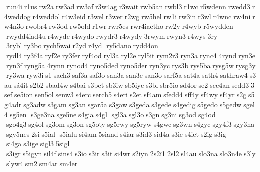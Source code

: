  run4i r1us rw2a rw3ad rw3af r3w4ag r3wait rwb5an rwbl3 r1wc r5wdenn rwedd3 r4weddog r4weddol r4w3eid r3wel r3wer r2wg rw5hel rw1i rw3in r3wl r4wnc rw4ni rw4n3o rwobr4 rw3od rw5old r1wr rwr5es 
rwr4iaetho rw2y r4wyb 	r5wydden  rwydd4iad4u r4wyde r4wydo rwydr3 r4wydy 3rwym rwyn3 r4wys 3ry  3rybl ry3bo rych5wai r2yd r4yd  ry5dano rydd4on  rydl4 ry3f4a ryf2e ry3fer ryf4od ryl3a ryl2e ryl5it rym2r3 ryn3a rync4 4rynd ryn3e ryn3f ryng5a 4rynn rynod4 ryno5ded ryno5der ryn3yc rys3b rys5ba rysg5w rysg3y ry3wa ryw3i s1 sach3 saf3a saf3o san3a san3e san3o sarf5a sat4a sath4 sathraw4 s3au sá4it s2b2 sbad4w s4bai s3bet sb3iw sb5iyc s3bl sbr5io sd4or se2 sec4an sedd3 3sef se5ion sen5ol senw3 s4erc serch5 s4eri s2et sf4am sfedd4 sff4y sf4wy sf4yr s2g s5g4adr sg3adw s3gam sg3an sgar5a s3gaw s3geda s3gede s4gedig s5gedo s5gedw sgel4 sg5en  s3ge3na sge5ne s4gia s4gl  sgl3a sgl3o s3gn sg3ni sg3od sg4od  sgo4g3 sg4ol sg3om sg3on sg5oty sg5rwy sg5ryw s4gwc sg3wn s4gyc sgy4f3 sgy3na sgy5nes 2si s5ial  s5ialu si4am 5siand s4iar s3id3 sid4a s3ie s4iet s2ig s3ig  si4ga s3ige sigl3 5sigl  s3igr s5igyn sil4f sins4 s3io s3ir s3it si4wr s2iyn 2s2ï1 2sl2 sl4au slo3na slo3n4e s3ly slyw4 sm2 sm4ar sm4er 

